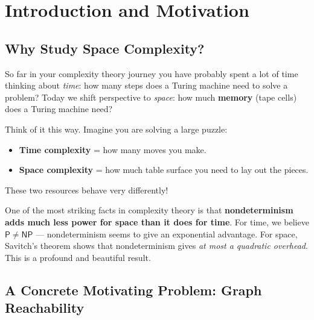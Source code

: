 \documentclass[12pt,a4paper]{article}
\theoremstyle{plain}
\theoremstyle{definition}
\theoremstyle{remark}
\newcommand{\NP}{\mathsf{NP}}
\newcommand{\PP}{\mathsf{P}}
\begin{document}
\tableofcontents
\newpage

\section{Introduction and Motivation}

\subsection{Why Study Space Complexity?}

So far in your complexity theory journey you have probably spent a lot of time thinking about \emph{time}: how many steps does a Turing machine need to solve a problem? Today we shift perspective to \emph{space}: how much \textbf{memory} (tape cells) does a Turing machine need?

\begin{intuitionbox}
Think of it this way. Imagine you are solving a large puzzle:
\begin{itemize}
  \item \textbf{Time complexity} = how many moves you make.
  \item \textbf{Space complexity} = how much table surface you need to lay out the pieces.
\end{itemize}
These two resources behave very differently!
\end{intuitionbox}

One of the most striking facts in complexity theory is that \textbf{nondeterminism adds much less power for space than it does for time}. For time, we believe $\PP \neq \NP$ — nondeterminism seems to give an exponential advantage. For space, Savitch's theorem shows that nondeterminism gives \emph{at most a quadratic overhead}. This is a profound and beautiful result.

\subsection{A Concrete Motivating Problem: Graph Reachability}
\end{document}
